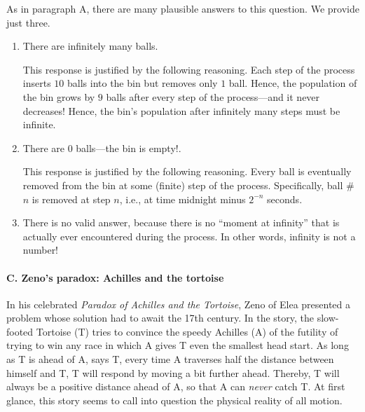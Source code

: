 \noindent
As in paragraph {\small\sf A}, there are many plausible answers to
this question.  We provide just three.
\begin{enumerate}
\item
There are infinitely many balls.

This response is justified by the following reasoning.  Each step of
the process inserts $10$ balls into the bin but removes only $1$ ball.
Hence, the population of the bin grows by $9$ balls after every step
of the process---and it never decreases!  Hence, the bin's population
after infinitely many steps must be infinite.

\item
There are $0$ balls---the bin is empty!.

This response is justified by the following reasoning.  Every ball is
eventually removed from the bin at some (finite) step of the process.
Specifically, ball \#$n$ is removed at step $n$, i.e., at time
midnight minus $2^{-n}$ seconds.

\item
There is no valid answer, because there is no ``moment at infinity''
that is actually ever encountered during the process.
In other words, infinity is not a number!
\end{enumerate}


\paragraph{\small\sf C.  Zeno's paradox: Achilles and the tortoise}

In his celebrated {\it Paradox of Achilles and the Tortoise}, Zeno of
Elea   presented a
problem whose solution had to await the 17th century.  In the story,
the slow-footed Tortoise (T) tries to convince the speedy Achilles (A)
of the futility of trying to win any race in which A gives T even the
smallest head start.  As long as T is ahead of A, says T, every time A
traverses half the distance between himself and T, T will respond by
moving a bit further ahead.  Thereby, T will always be a positive
distance ahead of A, so that A can {\em never} catch T.  At first
glance, this story seems to call into question the physical reality of
all motion.


